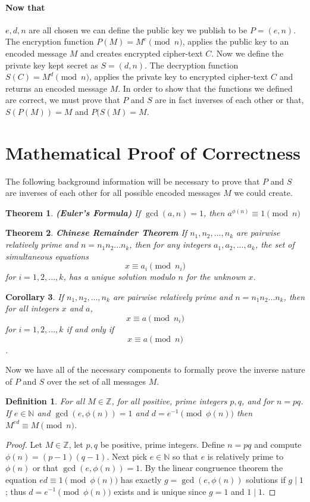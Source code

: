 \documentclass[12pt]{article}
\newcommand{\Z}{\mathbb{Z}}
\newcommand{\N}{\mathbb{N}}
\newtheorem{theorem}{Theorem}[section]
\newtheorem{corollary}[theorem]{Corollary}
\newtheorem{definition}{Definition}[section]
\theoremstyle{remark}
\begin{document}
\paragraph{Now that} $e,d,n$ are all chosen we can define the public key we publish to be $P=(e,n)$.  The encryption function $P(M)= M^e \pmod{n}$, applies the public key to an encoded message $M$ and creates encrypted cipher-text $C$.  Now we define the private key kept secret as $S=(d,n)$.  The decryption function $S(C) = M^d \pmod{n}$, applies the private key to encrypted cipher-text $C$ and returns an encoded message $M$.  In order to show that the functions we defined are correct, we must prove that $P$ and $S$ are in fact inverses of each other or that, $S(P(M)) = M$ and $P(S(M) = M$. 

\section{Mathematical Proof of Correctness}

The following background information will be necessary to prove that $P$ and $S$ are inverses of each other for all possible encoded messages $M$ we could create.
\begin{theorem}
\label{eul_thm}
\emph{\textbf{(Euler's Formula)}} If $\gcd(a, n) = 1$, then $a^{\phi(n)}\equiv 1 \pmod{n}$
\end{theorem}

\begin{theorem}
\label{chi_thm}
\emph{\textbf{Chinese Remainder Theorem}}  If $n_1,n_2,...,n_k$ are pairwise relatively prime and $n=n_1n_2...n_k$, then for any integers $a_1,a_2,...,a_k$, the set of simultaneous equations
\[x\equiv a_i \pmod{n_i}\]
for $i=1,2,...,k$, has a unique solution modulo $n$ for the unknown $x$.
\end{theorem}

\begin{corollary}
\label{chi_thm2}
If $n_1,n_2,...,n_k$ are pairwise relatively prime and $n=n_1n_2...n_k$, then for all integers $x$ and $a$,
\[x \equiv a \pmod{n_i}\]
for $i=1,2,...,k$ if and only if
\[x \equiv a \pmod{n} \].
\end{corollary}

Now we have all of the necessary components to formally prove the inverse nature of $P$ and $S$ over the set of all messages $M$.

\begin{definition}
For all $M\in \Z$, for all positive, prime integers $p,q$, and for $n=pq$.  If $e\in \N$ and $\gcd(e,\phi(n))=1$ and $d = e^{-1}\pmod{\phi(n)}$ then $M^{ed}\equiv M \pmod{n}$.
\end{definition}

\begin{proof}
Let $M\in \Z$, let $p,q$ be positive, prime integers.  Define $n=pq$ and compute $\phi(n) = (p-1)(q-1)$.  Next pick $e\in \N$ so that $e$ is relatively prime to $\phi(n)$ or that $\gcd(e,\phi(n))=1$.  By the linear congruence theorem the equation $ed \equiv 1 \pmod{\phi(n)}$ has exactly $g = \gcd(e,\phi(n))$ solutions if $g \mid 1$; thus $d = e^{-1} \pmod{\phi(n)}$ exists and is unique since $g=1$ and $1\mid 1$.

\end{proof}
\end{document}
